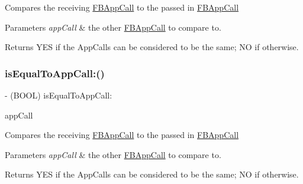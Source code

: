 Compares the receiving \hyperlink{interfaceFBAppCall}{F\+B\+App\+Call} to the passed in \hyperlink{interfaceFBAppCall}{F\+B\+App\+Call}


\begin{DoxyParams}{Parameters}
{\em app\+Call} & the other \hyperlink{interfaceFBAppCall}{F\+B\+App\+Call} to compare to.\\
\hline
\end{DoxyParams}
\begin{DoxyReturn}{Returns}
Y\+ES if the App\+Calls can be considered to be the same; NO if otherwise. 
\end{DoxyReturn}
\mbox{\label{interfaceFBAppCall_a4baed85de4c4f827874a7db76a2040b3}} 
\subsubsection{\texorpdfstring{is\+Equal\+To\+App\+Call\+:()}{isEqualToAppCall:()}\hspace{0.1cm}{\footnotesize\ttfamily [2/5]}}
{\footnotesize\ttfamily -\/ (B\+O\+OL) is\+Equal\+To\+App\+Call\+: \begin{DoxyParamCaption}\item[{(\hyperlink{interfaceFBAppCall}{F\+B\+App\+Call} $\ast$)}]{app\+Call }\end{DoxyParamCaption}}

Compares the receiving \hyperlink{interfaceFBAppCall}{F\+B\+App\+Call} to the passed in \hyperlink{interfaceFBAppCall}{F\+B\+App\+Call}


\begin{DoxyParams}{Parameters}
{\em app\+Call} & the other \hyperlink{interfaceFBAppCall}{F\+B\+App\+Call} to compare to.\\
\hline
\end{DoxyParams}
\begin{DoxyReturn}{Returns}
Y\+ES if the App\+Calls can be considered to be the same; NO if otherwise. 
\end{DoxyReturn}
\mbox{\label{interfaceFBAppCall_a4baed85de4c4f827874a7db76a2040b3}} 
